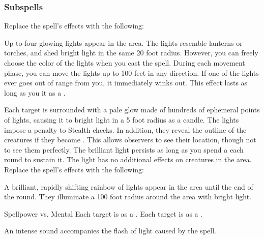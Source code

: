 \subsubsection{Subspells}
Replace the spell's effects with the following:
\begin{spellcontent}
\begin{augmenteffects}
\spelleffect
Up to four glowing lights appear in the area.
The lights resemble lanterns or torches, and shed bright light in the same 20 foot radius.
However, you can freely choose the color of the lights when you cast the spell.
During each movement phase, you can move the lights up to 100 feet in any direction.
If one of the lights ever goes out of range from you, it immediately winks out.
This effect lasts as long as you  it as a .
\end{augmenteffects}
\end{spellcontent}
Each target is surrounded with a pale glow made of hundreds of ephemeral points of lights, causing it to bright light in a 5 foot radius as a candle.
The lights impose a  penalty to Stealth checks.
In addition, they reveal the outline of the creatures if they become .
This allows observers to see their location, though not to see them perfectly.
The brilliant light persists as long as you spend a  each round to sustain it.
The light has no additional effects on creatures in the area.
Replace the spell's effects with the following:
\begin{spellcontent}
\begin{augmenteffects}
\spelleffect
A brilliant, rapidly shifting rainbow of lights appear in the area until the end of the round.
They illuminate a 100 foot radius around the area with bright light.
\begin{spellattack}{Spellpower vs. Mental}
\spellsuccess
Each target is \disoriented as a .
\spellcritical
Each target is \confused as a .
\end{spellattack}
\end{augmenteffects}
\end{spellcontent}
An intense sound accompanies the flash of light caused by the spell.
